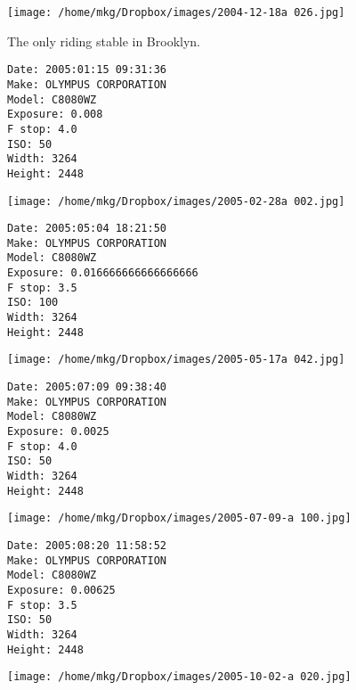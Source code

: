 \clearpage
\texttt{[image: /home/mkg/Dropbox/images/2004-12-18a 026.jpg]}

\clearpage

\noindent The only riding stable in Brooklyn.

\begin{lstlisting}
Date: 2005:01:15 09:31:36
Make: OLYMPUS CORPORATION
Model: C8080WZ
Exposure: 0.008
F stop: 4.0
ISO: 50
Width: 3264
Height: 2448

\end{lstlisting}

\clearpage
\texttt{[image: /home/mkg/Dropbox/images/2005-02-28a 002.jpg]}

\clearpage

\noindent 

\begin{lstlisting}
Date: 2005:05:04 18:21:50
Make: OLYMPUS CORPORATION
Model: C8080WZ
Exposure: 0.016666666666666666
F stop: 3.5
ISO: 100
Width: 3264
Height: 2448

\end{lstlisting}

\clearpage
\texttt{[image: /home/mkg/Dropbox/images/2005-05-17a 042.jpg]}

\clearpage

\noindent 

\begin{lstlisting}
Date: 2005:07:09 09:38:40
Make: OLYMPUS CORPORATION
Model: C8080WZ
Exposure: 0.0025
F stop: 4.0
ISO: 50
Width: 3264
Height: 2448

\end{lstlisting}

\clearpage
\texttt{[image: /home/mkg/Dropbox/images/2005-07-09-a 100.jpg]}

\clearpage

\noindent 

\begin{lstlisting}
Date: 2005:08:20 11:58:52
Make: OLYMPUS CORPORATION
Model: C8080WZ
Exposure: 0.00625
F stop: 3.5
ISO: 50
Width: 3264
Height: 2448

\end{lstlisting}

\clearpage
\texttt{[image: /home/mkg/Dropbox/images/2005-10-02-a 020.jpg]}

